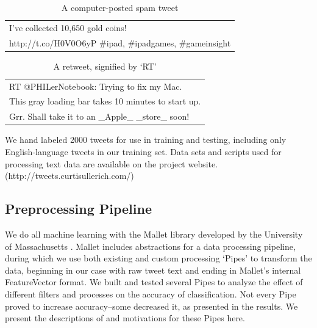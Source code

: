 \documentclass[letterpaper]{article}
\begin{document}
\begin{table}[h]
\centering
\begin{tabular}{|l|}
	\hline
	I've collected 10,650 gold coins! \\ http://t.co/H0V0O6yP \#ipad, \#ipadgames, \#gameinsight\\
	\hline
\end{tabular}
\caption{A computer-posted spam tweet}
\end{table}

\begin{table}[h]
\centering
\begin{tabular}{|l|}
	\hline
	RT @PHILerNotebook: Trying to fix my Mac. \\ This gray loading bar takes 10 minutes to start up. \\ Grr. Shall take it to an \_Apple\_ \_store\_ soon! \\
	\hline
\end{tabular}
\caption{A retweet, signified by `RT'}
\end{table}

We hand labeled 2000 tweets for use in training and testing, including only English-language tweets in our training set. Data sets and scripts used for processing text data are available on the project website.\\
 (http://tweets.curtisullerich.com/)\\

\subsection{Preprocessing Pipeline}

We do all machine learning with the Mallet library developed by the University of Massachusetts \cite{McCallumMALLET}. Mallet includes abstractions for a data processing pipeline, during which we use both existing and custom processing `Pipes' to transform the data, beginning in our case with raw tweet text and ending in Mallet's internal FeatureVector format. We built and tested several Pipes to analyze the effect of different filters and processes on the accuracy of classification. Not every Pipe proved to increase accuracy--some decreased it, as presented in the results. We present the descriptions of and motivations for these Pipes here.
\end{document}
